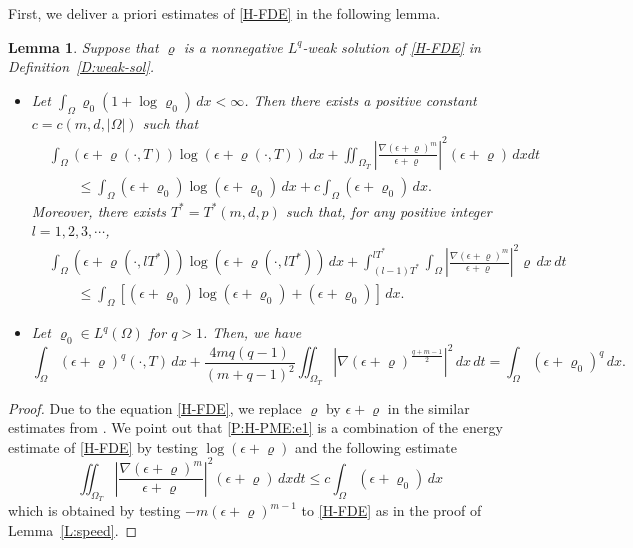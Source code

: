 \documentclass{amsart}
\newtheorem{lemma}[defn]{Lemma}
\numberwithin{equation}{section}
\newcommand{\abs}[1]{\left| #1 \right|}
\begin{document}
First, we deliver a priori estimates of \eqref{H-FDE} in the following lemma.
\begin{lemma}\label{P:H-PME:e}\cite[Lemma~5.1]{HKK01}
Suppose that $\varrho$ is a nonnegative $L^q$-weak solution of \eqref{H-FDE} in Definition~\ref{D:weak-sol}.
\begin{itemize}
  \item[(i)] Let $\int_{\Omega} \varrho_0 (1+\log \varrho_0 ) \,dx < \infty$. Then there exists a positive constant $c=c(m,d,|\Omega|)$ such that
      \begin{equation}\label{P:H-PME:e1}
      \begin{aligned}
      &\int_{\Omega} (\epsilon+\varrho(\cdot, T)) \log  (\epsilon+\varrho(\cdot, T))  \,dx + \iint_{\Omega_{T}} \left|\frac{\nabla (\epsilon + \varrho)^m}{\epsilon + \varrho}\right|^2 (\epsilon + \varrho) \,dxdt \\
      & \qquad \leq \int_{\Omega} (\epsilon+\varrho_0) \log  (\epsilon+\varrho_0) \,dx + c\int_{\Omega} (\epsilon + \varrho_0) \,dx.
        \end{aligned} \end{equation}
      Moreover, there exists $T^\ast = T^\ast (m,d,p)$ such that, for any positive integer $l=1,2,3,\cdots$,
        \begin{equation*}\label{C:H-PME:e1}\begin{aligned}
      &\int_{\Omega}  (\epsilon+\varrho (\cdot, lT^\ast)) \log (\epsilon + \varrho(\cdot, l T^\ast))  \,dx
      + \int_{(l-1)T^\ast}^{lT^\ast}\int_{\Omega} \abs{\frac{\nabla (\epsilon +\varrho)^m}{\epsilon +\varrho}}^ {2} \varrho \,dx\,dt \\
      &\qquad \leq \int_{\Omega} \left[(\epsilon+\varrho_0) \log  (\epsilon+\varrho_0) + (\epsilon + \varrho_0)\right] \,dx.
      \end{aligned}\end{equation*}
  \item[(ii)]Let $\varrho_0 \in L^{q}(\Omega)$ for $q>1$. Then, we have
  \begin{equation*}\label{P:H-PME:e2}
      \int_{\Omega} (\epsilon+\varrho)^q(\cdot, T) \,dx + \frac{4mq(q-1)}{(m+q-1)^2} \iint_{\Omega_T} \left| \nabla (\epsilon+\varrho)^{\frac{q+m-1}{2}} \right|^2  \,dx\,dt = \int_{\Omega} (\epsilon+\varrho_0)^q \,dx.
          \end{equation*}
\end{itemize}
\end{lemma}

\begin{proof}
	Due to the equation \eqref{H-FDE}, we replace $\varrho$ by $\epsilon + \varrho$ in the similar estimates from \cite[Lemma~5.1]{HKK01}. We point out that \eqref{P:H-PME:e1} is a combination of the energy estimate of \eqref{H-FDE} by testing $\log (\epsilon + \varrho)$ and the following estimate
	\[
       \iint_{\Omega_{T}} \left|\frac{\nabla (\epsilon + \varrho)^m}{\epsilon + \varrho}\right|^2 (\epsilon + \varrho) \,dxdt \leq c\int_{\Omega} (\epsilon + \varrho_0) \,dx
       \]  
       which is obtained by testing $-m(\epsilon + \varrho)^{m-1}$ to \eqref{H-FDE} as in the proof of Lemma~\ref{L:speed}.
\end{proof}
\end{document}

